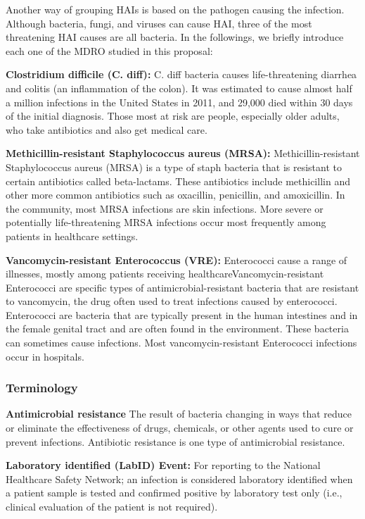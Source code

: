Another way of grouping HAIs is based on the pathogen causing the infection. Although bacteria, fungi, and viruses can cause HAI, three of the most threatening HAI causes are all bacteria. In the followings, we briefly introduce each one of the MDRO studied in this proposal:

{\bf Clostridium difficile (C. diff):} C. diff bacteria causes life-threatening diarrhea and colitis (an inflammation of the colon). It was estimated to cause almost half a million infections in the United States in 2011, and 29,000 died within 30 days of the initial diagnosis. Those most at risk are people, especially older adults, who take antibiotics and also get medical care.

{\bf Methicillin-resistant Staphylococcus aureus (MRSA):}  Methicillin-resistant Staphylococcus aureus (MRSA) is a type of staph bacteria that is resistant to certain antibiotics called beta-lactams. These antibiotics include methicillin and other more common antibiotics such as oxacillin, penicillin, and amoxicillin. In the community, most MRSA infections are skin infections. More severe or potentially life-threatening MRSA infections occur most frequently among patients in healthcare settings.

{\bf Vancomycin-resistant Enterococcus (VRE):} Enterococci cause a range of illnesses, mostly among patients receiving healthcareVancomycin-resistant Enterococci are specific types of antimicrobial-resistant bacteria that are resistant to vancomycin, the drug often used to treat infections caused by enterococci. Enterococci are bacteria that are typically present in the human intestines and in the female genital tract and are often found in the environment. These bacteria can sometimes cause infections. Most vancomycin-resistant Enterococci infections occur in hospitals. 

\subsubsection{Terminology}
{\bf Antimicrobial resistance} The result of bacteria changing in ways that reduce or eliminate the effectiveness of drugs, chemicals, or other agents
used to cure or prevent infections. Antibiotic resistance is one type of antimicrobial resistance. 

{\bf Laboratory identified (LabID) Event:} For reporting to the National Healthcare Safety Network; an infection is considered laboratory
identified when a patient sample is tested and confirmed positive by laboratory test only (i.e., clinical evaluation of the patient is not required).

